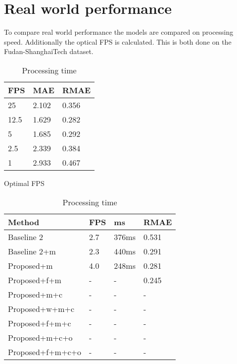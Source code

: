 \section{Real world performance}
To compare real world performance the models are compared on processing speed. Additionally the optical FPS is calculated. This is both done on the Fudan-ShanghaiTech dataset.

\begin{table}[!htb]
\begin{minipage}{.5\linewidth}
\centering
\begin{tabular}{lll}
		\hline
		FPS                               & MAE & RMAE \\ \hline
		\multicolumn{1}{l|}{25}          & 2.102 & 0.356 \\
		\multicolumn{1}{l|}{12.5}        & 1.629 & 0.282 \\
		\multicolumn{1}{l|}{5}        & 1.685 & 0.292 \\
		\multicolumn{1}{l|}{2.5} & 2.339 & 0.384 \\
		\multicolumn{1}{l|}{1} & 2.933 & 0.467 \\ \hline
		\end{tabular}
\caption{\label{tab:fps_fudan} Optimal FPS}
\end{minipage}
\begin{minipage}{.5\linewidth}
\centering
\begin{tabular}{llll}
\hline
Method                             & FPS & ms & RMAE \\ \hline
\multicolumn{1}{l|}{Baseline 2}    & 2.7 & 376ms & 0.531 \\
\multicolumn{1}{l|}{Baseline 2+m} & 2.3 & 440ms & 0.291\\
\multicolumn{1}{l|}{Proposed+m}      & 4.0 & 248ms & 0.281 \\
\multicolumn{1}{l|}{Proposed+f+m} &- & - & 0.245 \\
\multicolumn{1}{l|}{Proposed+m+c}        & - & - & - \\
\multicolumn{1}{l|}{Proposed+w+m+c}        & - & - & - \\
\multicolumn{1}{l|}{Proposed+f+m+c}        & - & - & - \\
\multicolumn{1}{l|}{Proposed+m+c+o} & - & - & - \\
\multicolumn{1}{l|}{Proposed+f+m+c+o} & - & - & - \\ \hline
\end{tabular}
\caption{\label{tab:processing_fudan}Processing time}
\end{minipage} %
\end{table}

